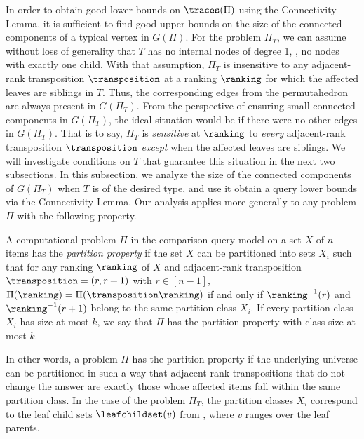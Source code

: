 \documentclass{toc}
\begin{document}
In order to obtain good lower bounds on $\traces(\Pi)$ using the Connectivity Lemma, it is sufficient to find good upper bounds on the size of the connected components of a typical vertex in $G(\Pi)$. For the problem $\Pi_T$, we can assume without loss of generality that $T$ has no internal nodes of degree 1, \ie, no nodes with exactly one child. With that assumption, $\Pi_T$ is insensitive to any adjacent-rank transposition $\transposition$ at a ranking $\ranking$ for which the affected leaves are siblings in $T$. Thus, the corresponding edges from the permutahedron are always present in $G(\Pi_T)$. From the perspective of ensuring small connected components in $G(\Pi_T)$, the ideal situation would be if there were no other edges in $G(\Pi_T)$. That is to say, $\Pi_T$ is \emph{sensitive} at $\ranking$ to \emph{every} adjacent-rank transposition $\transposition$ \emph{except} when the affected leaves are siblings. We will investigate conditions on $T$ that guarantee this situation in the next two subsections. In this subsection, we analyze the size of the connected components of $G(\Pi_T)$ when $T$ is of the desired type, and use it obtain a query lower bounds via the Connectivity Lemma. Our analysis applies more generally to any problem $\Pi$ with the following property.
\begin{definition}\label{def:partition-property}
A computational problem $\Pi$ in the comparison-query model on a set $X$ of $n$ items has the \emph{partition property} if the set $X$ can be partitioned into sets $X_i$ such that for any ranking $\ranking$ of $X$ and adjacent-rank transposition $\transposition = (r, r+1)$ with $r \in [n-1]$, $\Pi(\ranking) = \Pi(\transposition \ranking)$ if and only if $\ranking^{-1}(r)$ and $\ranking^{-1}(r+1)$ belong to the same partition class $X_i$. If every partition class $X_i$ has size at most $k$, we say that $\Pi$ has the partition property with class size at most $k$.
\end{definition}
In other words, a problem $\Pi$ has the partition property if the underlying universe can be partitioned in such a way that 
adjacent-rank transpositions that do not change the answer are exactly those whose affected items fall within the same partition class. In the case of the problem $\Pi_T$, the partition classes $X_i$ correspond to the leaf child sets $\leafchildset(v)$ from , where $v$ ranges over the leaf parents.
\end{document}
